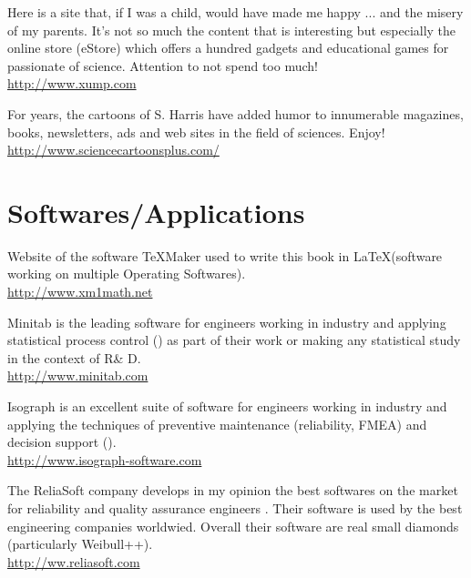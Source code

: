 	{\Large {}}{\Large {}} Here is a site that, if I was a child, would have made me happy ... and the misery of my parents. It's not so much the content that is interesting but especially the online store (eStore) which offers a hundred gadgets and educational games for passionate of science. Attention to not spend too much!\\
	\href{http://www.xump.com}{\color{blue}http://www.xump.com}
	
	{\Large {}}{\Large {}} For years, the cartoons of S. Harris have added humor to innumerable magazines, books, newsletters, ads and web sites in the field of sciences. Enjoy!\\
	\href{http://www.sciencecartoonsplus.com/}{\color{blue}http://www.sciencecartoonsplus.com/}
	
	\pagebreak
	\section{Softwares/Applications}
	
	{\Large {}}{\Large {}}{\Large {}}{\Large {}} Website of the software TeXMaker used to write this book in \LaTeX (software working on multiple Operating Softwares).\\
	\href{http://www.xm1math.net/texmaker/index.html}{\color{blue}http://www.xm1math.net}
	
	{\Large {}}{\Large {}}{\Large {}}{\Large {}} Minitab is the leading software for engineers working in industry and applying statistical process control () as part of their work or making any statistical study in the context of R\& D.\\
	\href{http://www.minitab.com}{\color{blue}http://www.minitab.com}
	
	{\Large {}}{\Large {}}{\Large {}}{\Large {}} Isograph is an excellent suite of software for engineers working in industry and applying the techniques of preventive maintenance (reliability, FMEA) and decision support ().\\
	\href{http://www.isograph-software.com}{\color{blue}http://www.isograph-software.com}
	
	{\Large {}}{\Large {}}{\Large {}}{\Large {}} The ReliaSoft company develops in my opinion the best softwares on the market for reliability and quality assurance engineers . Their software is used by the best engineering companies worldwied. Overall their software are real small diamonds (particularly Weibull++).\\
	\href{http://ww.reliasoft.com}{\color{blue}http://ww.reliasoft.com}
	
